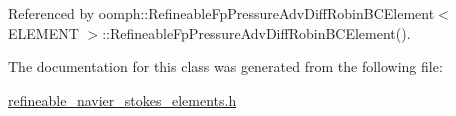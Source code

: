 Referenced by oomph\+::\+Refineable\+Fp\+Pressure\+Adv\+Diff\+Robin\+B\+C\+Element$<$ E\+L\+E\+M\+E\+N\+T $>$\+::\+Refineable\+Fp\+Pressure\+Adv\+Diff\+Robin\+B\+C\+Element().



The documentation for this class was generated from the following file\+:\begin{DoxyCompactItemize}
\item 
\hyperlink{refineable__navier__stokes__elements_8h}{refineable\+\_\+navier\+\_\+stokes\+\_\+elements.\+h}\end{DoxyCompactItemize}
